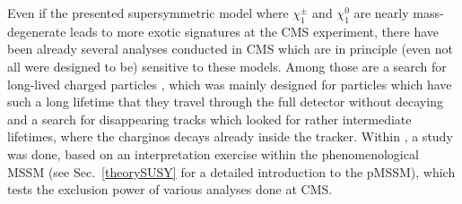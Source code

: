 Even if the presented supersymmetric model where $\chi^{\pm}_1$ and $\chi^{0}_1$ are nearly mass-degenerate leads to more exotic signatures at the CMS experiment, there have been already several analyses conducted in CMS which are in principle (even not all were designed to be) sensitive to these models.
Among those are a search for long-lived charged particles \cite{bib:CMS:HSCP_8TeV}, which was mainly designed for particles which have such a long lifetime that they travel through the full detector without decaying and a search for disappearing tracks \cite{bib:CMS:DT_8TeV} which looked for rather intermediate lifetimes, where the charginos decays already inside the tracker. 
Within \cite{bib:CMS:DT_8TeV}, a study was done, based on an interpretation exercise \cite{bib:CMS:HSCPReinterpreation_PAS} within the phenomenological MSSM (see Sec.~\ref{theorySUSY} for a detailed introduction to the pMSSM), which tests the exclusion power of various analyses done at CMS.


